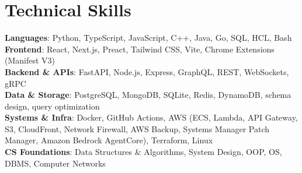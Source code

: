 \section{\textbf{Technical Skills}}
\vspace{-2pt}
\begin{itemize}[leftmargin=0.05in, label={}]
    \small{\item{
     \textbf{Languages}{: Python, TypeScript, JavaScript, C++, Java, Go, SQL, HCL, Bash} \\
     \textbf{Frontend}{: React, Next.js, Preact, Tailwind CSS, Vite, Chrome Extensions (Manifest V3)} \\
     \textbf{Backend \& APIs}{: FastAPI, Node.js, Express, GraphQL, REST, WebSockets, gRPC} \\
     \textbf{Data \& Storage}{: PostgreSQL, MongoDB, SQLite, Redis, DynamoDB, schema design, query optimization} \\
     \textbf{Systems \& Infra}{: Docker, GitHub Actions, AWS (ECS, Lambda, API Gateway, S3, CloudFront, Network Firewall, AWS Backup, Systems Manager Patch Manager, Amazon Bedrock AgentCore), Terraform, Linux} \\
     \textbf{CS Foundations}{: Data Structures \& Algorithms, System Design, OOP, OS, DBMS, Computer Networks}
    }}
\end{itemize}
\vspace{-2mm}
